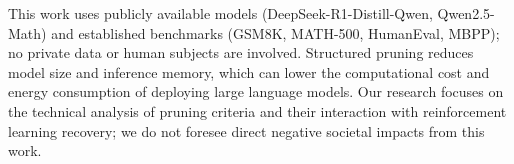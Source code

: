 This work uses publicly available models (DeepSeek-R1-Distill-Qwen, Qwen2.5-Math) and established benchmarks (GSM8K, MATH-500, HumanEval, MBPP); no private data or human subjects are involved.
Structured pruning reduces model size and inference memory, which can lower the computational cost and energy consumption of deploying large language models.
Our research focuses on the technical analysis of pruning criteria and their interaction with reinforcement learning recovery; we do not foresee direct negative societal impacts from this work.
